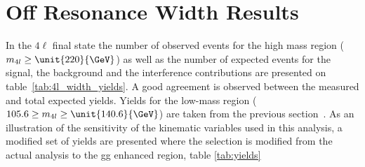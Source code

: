\section{Off Resonance Width Results}
\label{sec:Width_Results}

In the $4\ell$ final state the number of observed events for the high mass region ($m_{4l} \ge \unit{220}{\GeV}$) as well as the number of expected events for the signal, the background and the interference contributions are presented on table~\ref{tab:4l_width_yields}. A good agreement is observed between the measured and total expected yields. Yields for the low-mass region ($105.6 \ge m_{4l} \ge \unit{140.6}{\GeV}$) are taken from the previous section~\cite{Chatrchyan:2013mxa}. As an illustration of the sensitivity of the kinematic variables used in this analysis, a modified set of yields are presented where the selection is modified from the actual analysis to the gg enhanced region, table \ref{tab:yields}

